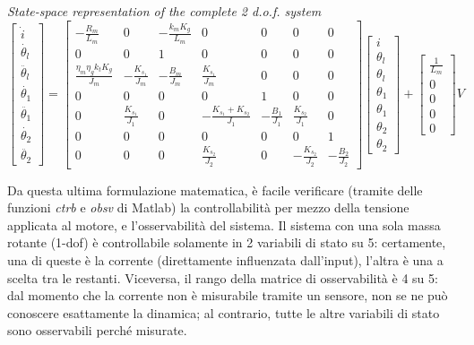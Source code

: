 \textit{State-space representation of the complete 2 d.o.f. system}
\begin{equation}
	\begin{bmatrix}
		\dot{i} \\
		\dot{\theta_l} \\
		\ddot{\theta_l} \\
		\dot{\theta_1} \\
		\ddot{\theta_1} \\
		\dot{\theta_2} \\
		\ddot{\theta_2}
	\end{bmatrix}
	=
	\begin{bmatrix}
		-\frac{R_m}{L_m} & 0 & -\frac{k_m K_g}{L_m} & 0 & 0 & 0 & 0 \\
		0 & 0 &1 & 0 & 0 & 0 & 0 \\
		\frac{\eta_m \eta_g k_t K_g}{J_m} & -\frac{K_{s_1}}{J_m} & -\frac{B_m}{J_m} & \frac{K_{s_1}}{J_m} & 0 & 0 & 0 \\
		0 & 0 & 0 & 0 & 1 & 0 & 0 \\
		0 & \frac{K_{s_1}}{J_1} & 0 & -\frac{K_{s_1}+K_{s_2}}{J_1} & -\frac{B_1}{J_1} & \frac{K_{s_2}}{J_1} & 0 \\
		0 & 0 & 0 & 0 & 0 & 0 & 1 \\
		0 & 0 & 0 & \frac{K_{s_2}}{J_2} & 0 & -\frac{K_{s_2}}{J_2} & -\frac{B_2}{J_2}
	\end{bmatrix}
	\begin{bmatrix}
		i \\
		\theta_l \\
		\theta_l \\
		\theta_1 \\
		\theta_1 \\
		\theta_2 \\
		\theta_2
	\end{bmatrix}
	+
	\begin{bmatrix}
		\frac{1}{L_m} \\
		0 \\
		0 \\
		0 \\
		0
	\end{bmatrix}
	V
\end{equation}

Da questa ultima formulazione matematica, è facile verificare (tramite delle funzioni \textit{ctrb} e \textit{obsv} di Matlab) la controllabilità per mezzo della tensione applicata al motore, e l'osservabilità del sistema.
Il sistema con una sola massa rotante (1-dof) è controllabile solamente in 2 variabili di stato su 5: certamente, una di queste è la corrente (direttamente influenzata dall'input), l'altra è una a scelta tra le restanti. Viceversa, il rango della matrice di osservabilità è 4 su 5: dal momento che la corrente non è misurabile tramite un sensore, non se ne può conoscere esattamente la dinamica; al contrario, tutte le altre variabili di stato sono osservabili perché misurate. \\

